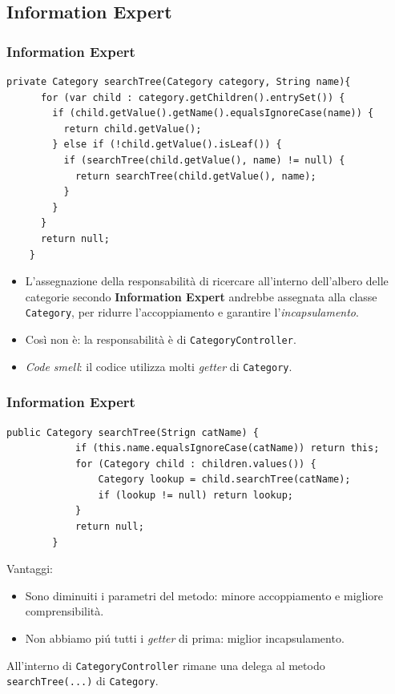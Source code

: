 \subsection{Information Expert}
\beamertitle

\begin{frame} [fragile]
  \frametitle{Information Expert}
    \begin{lstlisting}[autogobble, title={\texttt{CategoryController.java}}]
    private Category searchTree(Category category, String name){
      for (var child : category.getChildren().entrySet()) {
        if (child.getValue().getName().equalsIgnoreCase(name)) {
          return child.getValue();
        } else if (!child.getValue().isLeaf()) {
          if (searchTree(child.getValue(), name) != null) {
            return searchTree(child.getValue(), name);
          }
        }
      }
      return null;
    }
    \end{lstlisting}
  \begin{itemize}
    \item L'assegnazione della responsabilità di ricercare all'interno dell'albero delle categorie
    secondo \textbf{Information Expert} andrebbe assegnata alla classe \texttt{Category}, per ridurre
    l'accoppiamento e garantire l'\emph{incapsulamento}.
    \item Così non è: la responsabilità è di \texttt{CategoryController}.
    \item \emph{Code smell}: il codice utilizza molti \emph{getter} di \texttt{Category}.
  \end{itemize}
\end{frame}

\begin{frame} [fragile]
    \frametitle{Information Expert}
    \begin{lstlisting}[autogobble, title={\texttt{Category.java}}]
        public Category searchTree(Strign catName) {
            if (this.name.equalsIgnoreCase(catName)) return this;
            for (Category child : children.values()) {
                Category lookup = child.searchTree(catName);
                if (lookup != null) return lookup;
            }
            return null;
        }
    \end{lstlisting}
    Vantaggi:
    \begin{itemize}
        \item Sono diminuiti i parametri del metodo: {\color{green}minore accoppiamento} e {\color{green}migliore comprensibilità}.
        \item Non abbiamo piú tutti i \emph{getter} di prima: {\color{green}miglior incapsulamento}.
    \end{itemize}
    All'interno di \texttt{CategoryController} rimane una delega al metodo \texttt{searchTree(...)} di \texttt{Category}.
\end{frame}
